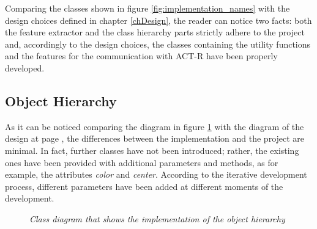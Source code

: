 	Comparing the classes shown in figure \ref{fig:implementation_names} with the design choices defined in chapter \ref{chDesign}, the reader can notice two facts: both the feature extractor and the class hierarchy parts strictly adhere to the project and, accordingly to the design choices, the classes containing the utility functions and the features for the communication with \mbox{ACT-R} have been properly developed.

	\subsection{Object Hierarchy}
	As it can be noticed comparing the diagram in figure \ref{fig:impl_hierarchy} with the diagram of the design at page \pageref{fig:HierarchyDesign}, the differences between the implementation and the project are minimal. 
	In fact, further classes have not been introduced; rather, the existing ones have been provided with additional parameters and methods, as for example, the attributes \emph{color} and \emph{center}.
	According to the iterative development process, different parameters have been added at different moments of the development.

	\begin{figure}[h]
	  \begin{center} 
	  \end{center} 
	  \caption{\textit{Class diagram that shows the implementation of the object hierarchy}}  
	  \label{fig:impl_hierarchy}
 	\end{figure}

